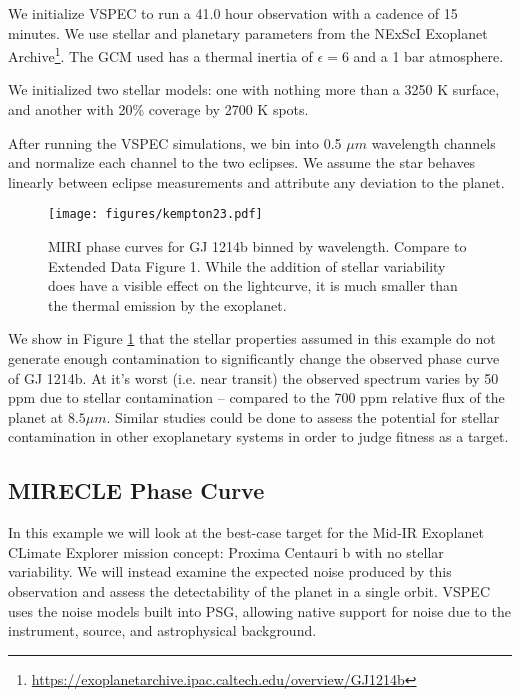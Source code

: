 \documentclass[twocolumn]{aastex631}
\begin{document}
We initialize {\sc VSPEC} to run a 41.0 hour observation with a cadence of 15 minutes. We use stellar and planetary parameters
from the NExScI Exoplanet Archive\footnote{\url{https://exoplanetarchive.ipac.caltech.edu/overview/GJ1214b}}.
The GCM used has a thermal inertia of $\epsilon = 6$ and a 1 bar  atmosphere.

We initialized two stellar models: one with nothing more than a 3250 K surface, and another with 20\% coverage by 2700 K spots.

After running the {\sc VSPEC} simulations, we bin into 0.5 $\mu m$ wavelength channels and normalize each channel to the two eclipses.
We assume the star behaves linearly between eclipse measurements and attribute any deviation to the planet.

\begin{figure}
    \centering
    \texttt{[image: figures/kempton23.pdf]}
    \caption{
        MIRI phase curves for GJ 1214b binned by wavelength. Compare to \citet{kempton2023} Extended Data Figure 1.
        While the addition of stellar variability does have a visible effect on the lightcurve, it is much smaller than the thermal emission by the exoplanet.
        }
    \label{fig:gj1214b}
\end{figure}

We show in Figure \ref{fig:gj1214b} that the stellar properties assumed in this example do not generate enough contamination to
significantly change the observed phase curve of GJ 1214b. At it's worst (i.e. near transit) the observed spectrum varies by 50 ppm due to stellar
contamination -- compared to the 700 ppm relative flux of the planet at $8.5 {\mu m}$. Similar studies could be done to assess the potential for
stellar contamination in other exoplanetary systems in order to judge fitness as a target.

\subsection{MIRECLE Phase Curve}
In this example we will look at the best-case target for the Mid-IR Exoplanet CLimate Explorer \citep[MIRECLE,][]{mandell2022}
mission concept: Proxima Centauri b with no stellar variability. We will instead examine the expected noise produced by this observation
and assess the detectability of the planet in a single orbit. {\sc VSPEC} uses the noise models built into PSG, allowing native support for
noise due to the instrument, source, and astrophysical background.
\end{document}
